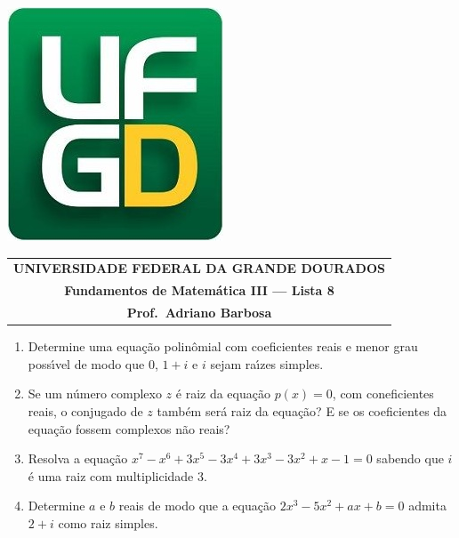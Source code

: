 \documentclass[a4paper,5pt]{amsbook}
\begin{document}
\thispagestyle{empty}
\pagestyle{empty}
\begin{minipage}[h]{0.14\textwidth}
	\includegraphics[scale=0.24]{../ufgd.png}
\end{minipage}
\begin{minipage}[h]{\textwidth}
\begin{tabular}{c}
{{\bf UNIVERSIDADE FEDERAL DA GRANDE DOURADOS}}\\
{{\bf Fundamentos de Matem\'{a}tica III --- Lista 8}}\\
{{\bf Prof.\ Adriano Barbosa}}\\
\end{tabular}
\vspace{-0.45cm}
%
\end{minipage}


\vspace{1cm}
\begin{enumerate}
	\vspace{0.5cm}
    \item Determine uma equa\c{c}\~ao polin\^omial com coeficientes reais e menor
        grau poss\'{\i}vel de modo que 0, $1+i$ e $i$ sejam ra\'{\i}zes simples.

	\vspace{0.5cm}
    \item Se um n\'umero complexo $z$ \'e raiz da equa\c{c}\~ao $p(x)=0$, com
        coneficientes reais, o conjugado de $z$ tamb\'em ser\'a raiz da equa\c{c}\~ao?
        E se os coeficientes da equa\c{c}\~ao fossem complexos n\~ao reais?

    \vspace{0.5cm}
    \item Resolva a equa\c{c}\~ao $x^7-x^6+3x^5-3x^4+3x^3-3x^2+x-1=0$ sabendo que
        $i$ \'e uma raiz com multiplicidade 3.

    \vspace{0.5cm}
    \item Determine $a$ e $b$ reais de modo que a equa\c{c}\~ao $2x^3-5x^2+ax+b=0$
        admita $2+i$ como raiz simples.
\end{enumerate}
\end{document}
